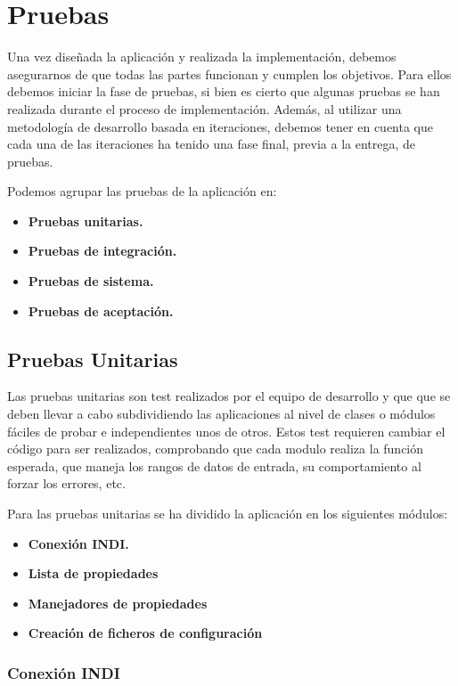 \chapter{Pruebas}

Una vez diseñada la aplicación y realizada la implementación, debemos asegurarnos de que todas las partes funcionan y cumplen los objetivos. Para ellos debemos iniciar la fase de pruebas, si bien es cierto que algunas pruebas se han realizada durante el proceso de implementación. Además, al utilizar una metodología de desarrollo basada en iteraciones, debemos tener en cuenta que cada una de las iteraciones ha tenido una fase final, previa a la entrega, de pruebas.

\bigskip
Podemos agrupar las pruebas de la aplicación en:

\begin{itemize}
  \item \textbf{Pruebas unitarias.}
  \item \textbf{Pruebas de integración.}
  \item \textbf{Pruebas de sistema.}
  \item \textbf{Pruebas de aceptación.}
\end{itemize}


\bigskip
\section{Pruebas Unitarias}

Las pruebas unitarias son test realizados por el equipo de desarrollo y que que se deben llevar a cabo subdividiendo las aplicaciones al nivel de clases o módulos fáciles de probar e independientes unos de otros. Estos test requieren cambiar el código para ser realizados, comprobando que cada modulo realiza la función esperada, que maneja los rangos de datos de entrada, su comportamiento al forzar los errores, etc.

Para las pruebas unitarias se ha dividido la aplicación en los siguientes módulos:

\begin{itemize}
  \item \textbf{Conexión INDI.}
  \item \textbf{Lista de propiedades}
  \item \textbf{Manejadores de propiedades}
  \item \textbf{Creación de ficheros de configuración}
\end{itemize}


\subsection{Conexión INDI}


